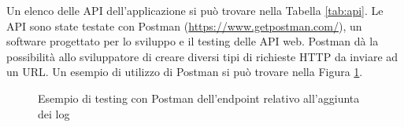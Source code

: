 \documentclass[12pt]{report}
\begin{document}
Un elenco delle API dell'applicazione si può trovare nella Tabella \ref{tab:api}.
Le API sono state testate con Postman (\url{https://www.getpostman.com/}), un software progettato per lo sviluppo e il testing delle API web. Postman dà la possibilità allo sviluppatore di creare diversi tipi di richieste HTTP da inviare ad un URL. Un esempio di utilizzo di Postman si può trovare nella Figura \ref{fig:postman_test}.

\begin{figure}[H]
	\caption{Esempio di testing con Postman dell'endpoint relativo all'aggiunta dei log}
	\label{fig:postman_test}
\end{figure}

\pagebreak
\end{document}
